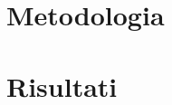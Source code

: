 \documentclass[12pt, a4paper]{article}
\begin{document}


\tableofcontents
\newpage


\newpage

\section{Metodologia}




\newpage

\section{Risultati}




\newpage


\newpage


\end{document}
